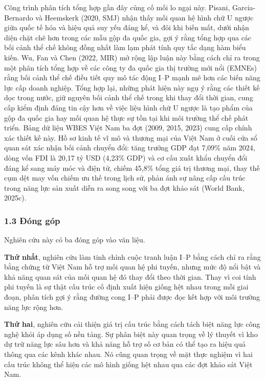 \documentclass[12pt,a4paper]{article}
\begin{document}
Công trình phân tích tổng hợp gần đây củng cố mối lo ngại này. Pisani,
Garcia-Bernardo và Heemskerk (2020, SMJ) nhận thấy mối quan hệ hình chữ
U ngược giữa quốc tế hóa và hiệu quả suy yếu đáng kể, và đôi khi biến
mất, dưới nhận diện chặt chẽ hơn trong các mẫu gộp đa quốc gia, gợi ý
rằng tổng hợp qua các bối cảnh thể chế không đồng nhất làm lạm phát tính
quy tắc dạng hàm biểu kiến. Wu, Fan và Chen (2022, MIR) mở rộng lập luận
này bằng cách chỉ ra trong một phân tích tổng hợp về các công ty đa quốc
gia thị trường mới nổi (EMNEs) rằng bối cảnh thể chế điều tiết quy mô
tác động I--P mạnh mẽ hơn các biến năng lực cấp doanh nghiệp. Tổng hợp
lại, những phát hiện này ngụ ý rằng các thiết kế dọc trong nước, giữ
nguyên bối cảnh thể chế trong khi thay đổi thời gian, cung cấp kiểm định
đáng tin cậy hơn về việc liệu hình chữ U ngược là tạo phẩm của gộp đa
quốc gia hay mối quan hệ thực sự tồn tại khi môi trường thể chế phát
triển. Bảng dữ liệu WBES Việt Nam ba đợt (2009, 2015, 2023) cung cấp
chính xác thiết kế này. Hồ sơ kinh tế vĩ mô và thương mại của Việt Nam ở
cuối cửa sổ quan sát xác nhận bối cảnh chuyển đổi: tăng trưởng GDP đạt
7,09\% năm 2024, dòng vốn FDI là 20,17 tỷ USD (4,23\% GDP) và cơ cấu
xuất khẩu chuyển đổi đáng kể sang máy móc và điện tử, chiếm 45,8\% tổng
giá trị thương mại, thay thế cụm dệt may vốn chiếm ưu thế trong lịch sử,
phản ánh sự nâng cấp cấu trúc trong năng lực sản xuất diễn ra song song
với ba đợt khảo sát (World Bank, 2025c).

\hypertarget{13-ux111uxf3ng-guxf3p}{%
\subsubsection{1.3 Đóng góp}\label{13-ux111uxf3ng-guxf3p}}

Nghiên cứu này có ba đóng góp vào văn liệu.

\textbf{Thứ nhất}, nghiên cứu làm tinh chỉnh cuộc tranh luận I--P bằng
cách chỉ ra rằng bằng chứng từ Việt Nam hỗ trợ mối quan hệ phi tuyến,
nhưng mức độ nổi bật và khả năng quan sát của mối quan hệ đó thay đổi
theo thời gian. Thay vì coi tính phi tuyến là sự thật cấu trúc cố định
xuất hiện giống hệt nhau trong mỗi giai đoạn, phân tích gợi ý rằng đường
cong I--P phải được đọc kết hợp với môi trường năng lực rộng hơn.

\textbf{Thứ hai}, nghiên cứu cải thiện giá trị cấu trúc bằng cách tách
biệt năng lực công nghệ khỏi áp dụng số nền tảng. Sự phân biệt này quan
trọng về lý thuyết vì kho dự trữ năng lực sâu hơn và khả năng hỗ trợ số
cơ bản có thể tạo ra hiệu quả thông qua các kênh khác nhau. Nó cũng quan
trọng về mặt thực nghiệm vì hai cấu trúc không thể hiện các mô hình
giống hệt nhau qua các đợt khảo sát Việt Nam.
\end{document}
